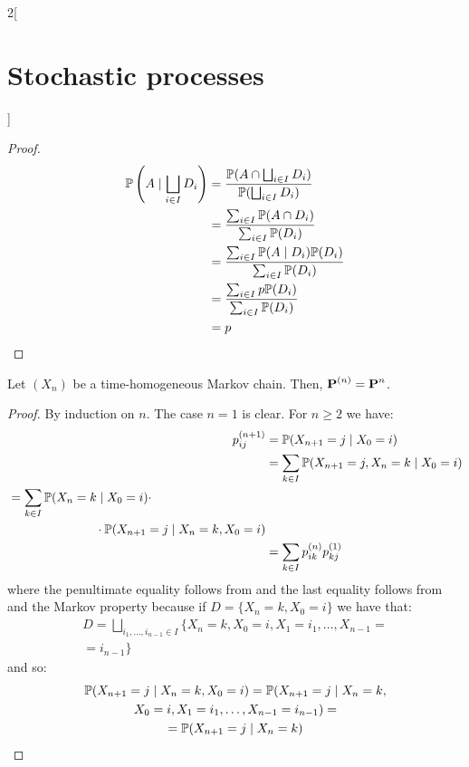 \documentclass[../../../main_math.tex]{subfiles}
\begin{document}
\begin{multicols}{2}[\section{Stochastic processes}]
\begin{proof}
\begin{align*}
      \mathbb{P}\left(A\mid \bigsqcup_{i\in I}D_i\right) & =\frac{\mathbb{P}(A\cap \bigsqcup_{i\in I}D_i)}{\mathbb{P}(\bigsqcup_{i\in I}D_i)} \\
                                                    & =\frac{\sum_{i\in I}\mathbb{P}(A\cap D_i)}{\sum_{i\in I}\mathbb{P}(D_i)}           \\
                                                    & =\frac{\sum_{i\in I}\mathbb{P}(A\mid D_i)\mathbb{P}(D_i)}{\sum_{i\in I}\mathbb{P}(D_i)} \\
                                                    & =\frac{\sum_{i\in I}p\mathbb{P}(D_i)}{\sum_{i\in I}\mathbb{P}(D_i)}                \\
                                                    & =p
    \end{align*}
  \end{proof}
  \begin{theorem}
    Let $(X_n)$ be a time-homogeneous Markov chain. Then, $\boldsymbol{\mathrm{P}}^{(n)}=\boldsymbol{\mathrm{P}}^n$.
  \end{theorem}
  \begin{proof}
    By induction on $n$. The case $n=1$ is clear. For $n\geq 2$ we have:
    \begin{align*}
      p_{ij}^{(n+1)} & =\mathbb{P}(X_{n+1}=j\mid X_0=i)                     \\
                     & =\sum_{k\in I}\mathbb{P}(X_{n+1}=j, X_n=k\mid X_0=i) \\
      \begin{split}
        &=\sum_{k\in I}\mathbb{P}(X_{n}=k\mid X_0=i)\cdot\\
        &\hspace{2.5cm}\cdot\mathbb{P}(X_{n+1}=j\mid X_n=k, X_0=i)
      \end{split}             \\
                     & =\sum_{k\in I}p_{ik}^{(n)}p_{kj}^{(1)}
    \end{align*}
    where the penultimate equality follows from  and the last equality follows from  and the Markov property because if $D=\{X_n=k, X_0=i\}$ we have that:
    \begin{multline*}
      D=\bigsqcup_{i_1,\ldots,i_{n-1}\in I}\{X_n=k, X_0=i,X_1=i_1,\ldots, X_{n-1}=\\=i_{n-1}\}
    \end{multline*}
    and so:
    \begin{multline*}
      \Prob(X_{n+1}=j\mid X_n=k, X_0=i)=\Prob(X_{n+1}=j\mid X_n=k,\\ X_0=i,X_1=i_1,\ldots,X_{n-1}=i_{n-1})=\\=\Prob(X_{n+1}=j\mid X_n=k)

\end{multline*}
\end{proof}
\end{multicols}
\end{document}
